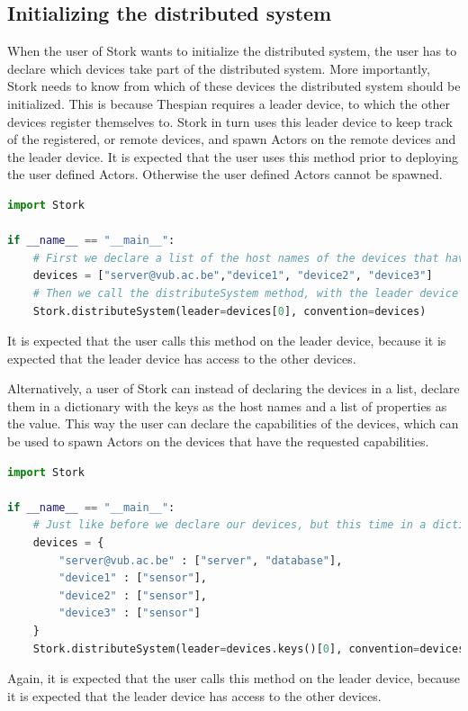\documentclass[a4paper]{article}
\begin{document}
\subsection{Initializing the distributed system}
When the user of Stork wants to initialize the distributed system, the user has to declare which devices take part of the distributed system. More importantly, Stork needs to know from which of these devices the distributed system should be initialized. This is because Thespian requires a leader device, to which the other devices register themselves to. Stork in turn uses this leader device to keep track of the registered, or remote devices, and spawn Actors on the remote devices and the leader device. It is expected that the user uses this method prior to deploying the user defined Actors. Otherwise the user defined Actors cannot be spawned.
\begin{lstlisting}[language=Python, caption=Initializing the distributed system, label=lst:init]
import Stork

if __name__ == "__main__":
    # First we declare a list of the host names of the devices that have to be part of our distributed system
    devices = ["server@vub.ac.be","device1", "device2", "device3"]
    # Then we call the distributeSystem method, with the leader device being the first host name in the list of devices.
    Stork.distributeSystem(leader=devices[0], convention=devices)
\end{lstlisting}
It is expected that the user calls this method on the leader device, because it is expected that the leader device has access to the other devices.

Alternatively, a user of Stork can instead of declaring the devices in a list, declare them in a dictionary with the keys as the host names and a list of properties as the value. This way the user can declare the capabilities of the devices, which can be used to spawn Actors on the devices that have the requested capabilities.
\begin{lstlisting}[language=Python, caption=Initializing the distributed system with capabilities, label=lst:initcap]
import Stork

if __name__ == "__main__":
    # Just like before we declare our devices, but this time in a dictionary with the host names as keys and the capabilities as values.
    devices = {
        "server@vub.ac.be" : ["server", "database"],
        "device1" : ["sensor"],
        "device2" : ["sensor"],
        "device3" : ["sensor"]
    }
    Stork.distributeSystem(leader=devices.keys()[0], convention=devices)
\end{lstlisting}
Again, it is expected that the user calls this method on the leader device, because it is expected that the leader device has access to the other devices.
\end{document}
